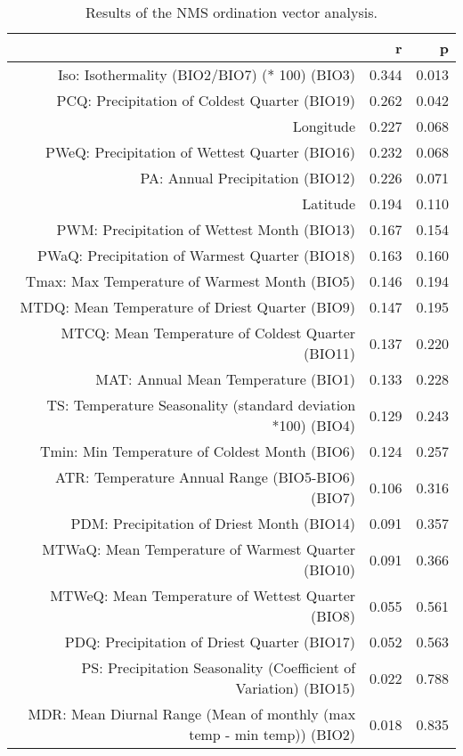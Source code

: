 \begin{table}[ht]
\centering
\begin{tabular}{rrr}
  \hline
 & r & p \\ 
  \hline
Iso: Isothermality (BIO2/BIO7) (* 100) (BIO3) & 0.344 & 0.013 \\ 
  PCQ: Precipitation of Coldest Quarter (BIO19) & 0.262 & 0.042 \\ 
  Longitude & 0.227 & 0.068 \\ 
  PWeQ: Precipitation of Wettest Quarter (BIO16) & 0.232 & 0.068 \\ 
  PA: Annual Precipitation (BIO12) & 0.226 & 0.071 \\ 
  Latitude & 0.194 & 0.110 \\ 
  PWM: Precipitation of Wettest Month (BIO13) & 0.167 & 0.154 \\ 
  PWaQ: Precipitation of Warmest Quarter (BIO18) & 0.163 & 0.160 \\ 
  Tmax: Max Temperature of Warmest Month (BIO5) & 0.146 & 0.194 \\ 
  MTDQ: Mean Temperature of Driest Quarter (BIO9) & 0.147 & 0.195 \\ 
  MTCQ: Mean Temperature of Coldest Quarter (BIO11) & 0.137 & 0.220 \\ 
  MAT: Annual Mean Temperature (BIO1) & 0.133 & 0.228 \\ 
  TS: Temperature Seasonality (standard deviation *100) (BIO4) & 0.129 & 0.243 \\ 
  Tmin: Min Temperature of Coldest Month (BIO6) & 0.124 & 0.257 \\ 
  ATR: Temperature Annual Range (BIO5-BIO6) (BIO7) & 0.106 & 0.316 \\ 
  PDM: Precipitation of Driest Month (BIO14) & 0.091 & 0.357 \\ 
  MTWaQ: Mean Temperature of Warmest Quarter (BIO10) & 0.091 & 0.366 \\ 
  MTWeQ: Mean Temperature of Wettest Quarter (BIO8) & 0.055 & 0.561 \\ 
  PDQ: Precipitation of Driest Quarter (BIO17) & 0.052 & 0.563 \\ 
  PS: Precipitation Seasonality (Coefficient of Variation) (BIO15) & 0.022 & 0.788 \\ 
  MDR: Mean Diurnal Range (Mean of monthly (max temp - min temp)) (BIO2) & 0.018 & 0.835 \\ 
   \hline
\end{tabular}
\caption{Results of the NMS ordination vector analysis.} 
\label{tab:wc_vec}
\end{table}
